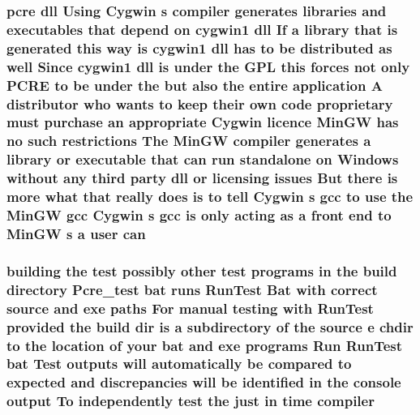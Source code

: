 \subsubsection[{\texorpdfstring{can}{can}}]{ {\bf pcre} dll Using Cygwin {\bf s} {\bf compiler} generates {\bf libraries} and executables that depend {\bf on} cygwin1 dll If {\bf a} {\bf library} that {\bf is} {\bf generated} {\bf this} {\bf way} {\bf is} cygwin1 dll has {\bf to} {\bf be} {\bf distributed} {\bf as} well Since cygwin1 dll {\bf is} under the {\bf G\+PL} {\bf this} forces {\bf not} only {\bf P\+C\+RE} {\bf to} {\bf be} under the but also the entire application {\bf A} distributor who wants {\bf to} keep their own {\bf code} proprietary must purchase an appropriate Cygwin {\bf licence} {\bf Min\+GW} has no such restrictions The {\bf Min\+GW} {\bf compiler} generates {\bf a} {\bf library} {\bf or} executable that can {\bf run} standalone {\bf on} {\bf Windows} without {\bf any} third party dll {\bf or} licensing issues But there {\bf is} more {\bf what} that really does {\bf is} {\bf to} tell Cygwin {\bf s} {\bf gcc} {\bf to} use the {\bf Min\+GW} {\bf gcc} Cygwin {\bf s} {\bf gcc} {\bf is} only acting {\bf as} {\bf a} front {\bf end} {\bf to} {\bf Min\+GW} {\bf s} {\bf a} user can}\hypertarget{NON-AUTOTOOLS-BUILD_8txt_a13fc6af2ed5289933c1bccc61e950f56}{}\label{NON-AUTOTOOLS-BUILD_8txt_a13fc6af2ed5289933c1bccc61e950f56}
\subsubsection[{\texorpdfstring{compiler}{compiler}}]{\setlength{\rightskip}{0pt plus 5cm}building the test possibly other test programs {\bf in} the build {\bf directory} Pcre\+\_\+test {\bf bat} runs Run\+Test Bat {\bf with} correct {\bf source} and {\bf exe} paths For manual testing {\bf with} Run\+Test provided the build {\bf dir} {\bf is} {\bf a} subdirectory {\bf of} the {\bf source} {\bf e} chdir {\bf to} the {\bf location} {\bf of} your {\bf bat} and {\bf exe} programs Run Run\+Test {\bf bat} Test outputs will automatically {\bf be} compared {\bf to} {\bf expected} and discrepancies will {\bf be} identified {\bf in} the console {\bf output} To independently test the just {\bf in} {\bf time} compiler}\hypertarget{NON-AUTOTOOLS-BUILD_8txt_a64002cde265dd3dc6769b7718a559183}{}\label{NON-AUTOTOOLS-BUILD_8txt_a64002cde265dd3dc6769b7718a559183}
